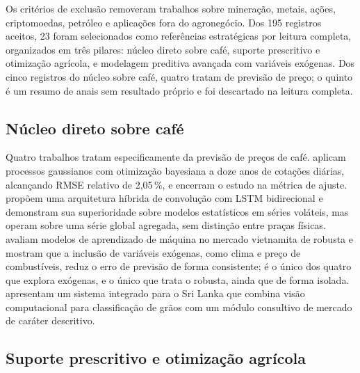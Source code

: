 Os critérios de exclusão removeram trabalhos sobre mineração, metais, ações, criptomoedas, petróleo e aplicações fora do agronegócio. Dos 195 registros aceitos, 23 foram selecionados como referências estratégicas por leitura completa, organizados em três pilares: núcleo direto sobre café, suporte prescritivo e otimização agrícola, e modelagem preditiva avançada com variáveis exógenas. Dos cinco registros do núcleo sobre café, quatro tratam de previsão de preço; o quinto é um resumo de anais sem resultado próprio e foi descartado na leitura completa.

\subsection{Núcleo direto sobre café}

Quatro trabalhos tratam especificamente da previsão de preços de café.  aplicam processos gaussianos com otimização bayesiana a doze anos de cotações diárias, alcançando RMSE relativo de 2,05\,\%, e encerram o estudo na métrica de ajuste.  propõem uma arquitetura híbrida de convolução com LSTM bidirecional e demonstram sua superioridade sobre modelos estatísticos em séries voláteis, mas operam sobre uma série global agregada, sem distinção entre praças físicas.  avaliam modelos de aprendizado de máquina no mercado vietnamita de robusta e mostram que a inclusão de variáveis exógenas, como clima e preço de combustíveis, reduz o erro de previsão de forma consistente; é o único dos quatro que explora exógenas, e o único que trata o robusta, ainda que de forma isolada.  apresentam um sistema integrado para o Sri Lanka que combina visão computacional para classificação de grãos com um módulo consultivo de mercado de caráter descritivo.

\subsection{Suporte prescritivo e otimização agrícola}

